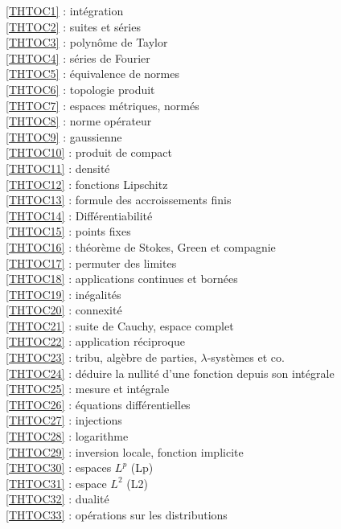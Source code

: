 \ref {THTOC1} : intégration\\
\ref {THTOC2} : suites et séries\\
\ref {THTOC3} : polynôme de Taylor\\
\ref {THTOC4} : séries de Fourier\\
\ref {THTOC5} : équivalence de normes\\
\ref {THTOC6} : topologie produit\\
\ref {THTOC7} : espaces métriques, normés\\
\ref {THTOC8} : norme opérateur\\
\ref {THTOC9} : gaussienne\\
\ref {THTOC10} : produit de compact\\
\ref {THTOC11} : densité\\
\ref {THTOC12} : fonctions Lipschitz\\
\ref {THTOC13} : formule des accroissements finis\\
\ref {THTOC14} : Différentiabilité\\
\ref {THTOC15} : points fixes\\
\ref {THTOC16} : théorème de Stokes, Green et compagnie\\
\ref {THTOC17} : permuter des limites\\
\ref {THTOC18} : applications continues et bornées\\
\ref {THTOC19} : inégalités\\
\ref {THTOC20} : connexité\\
\ref {THTOC21} : suite de Cauchy, espace complet\\
\ref {THTOC22} : application réciproque\\
\ref {THTOC23} : tribu, algèbre de parties, \( \lambda \)-systèmes et co.\\
\ref {THTOC24} : déduire la nullité d'une fonction depuis son intégrale\\
\ref {THTOC25} : mesure et intégrale\\
\ref {THTOC26} : équations différentielles\\
\ref {THTOC27} : injections\\
\ref {THTOC28} : logarithme\\
\ref {THTOC29} : inversion locale, fonction implicite\\
\ref {THTOC30} : espaces \( L^p\) (Lp)\\
\ref {THTOC31} : espace \( L^2\) (L2)\\
\ref {THTOC32} : dualité\\
\ref {THTOC33} : opérations sur les distributions\\
